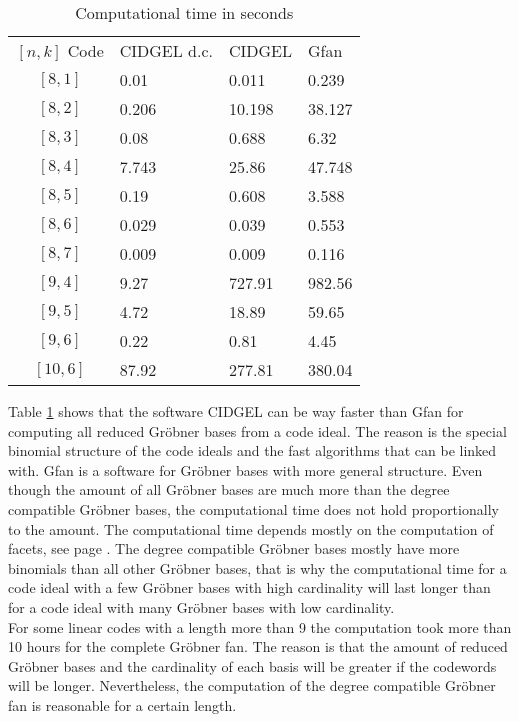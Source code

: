  \begin{table}[htpb] 
 \centering 
 \caption{Computational time in seconds}
 \begin{tabular}{c|l|l|l} %
   $[n,k]$ Code & CIDGEL d.c. & CIDGEL & Gfan \\
 \cline{1-4} $[8,1]$  & 0.01  & 0.011  & 0.239 \\
 			 $[8,2]$  & 0.206 & 10.198 & 38.127 \\
  			 $[8,3]$  & 0.08  & 0.688  & 6.32 \\
  			 $[8,4]$  & 7.743 & 25.86  & 47.748 \\
 			 $[8,5]$  & 0.19  & 0.608  & 3.588  \\
 			 $[8,6]$  & 0.029 & 0.039  & 0.553\\
  			 $[8,7]$  & 0.009 & 0.009  & 0.116 \\
  			 $[9,4]$  & 9.27  & 727.91 & 982.56 \\
  			 $[9,5]$  & 4.72  & 18.89  & 59.65 \\
  			 $[9,6]$  & 0.22  & 0.81   & 4.45 \\
  			 $[10,6]$ & 87.92 & 277.81 & 380.04 \\
 \end{tabular}
 \label{tab:benchmark}
 \end{table}  
 
 \newpage
 
 Table \ref{tab:benchmark} shows that the software CIDGEL can be way faster than Gfan for computing all reduced Gröbner bases from a code ideal. The reason is the special binomial structure of the code ideals and the fast algorithms that can be linked with. Gfan is a software for Gröbner bases with more general structure.
 Even though the amount of all Gröbner bases are much more than the degree compatible Gröbner bases, the computational time does not hold proportionally to the amount.
 The computational time depends mostly on the computation of facets, see page \pageref{facets}. The degree compatible Gröbner bases mostly have more binomials than all other Gröbner bases, that is why the computational time for a code ideal with a few Gröbner bases with high cardinality will last longer than for a code ideal with many Gröbner bases with low cardinality. \\
 
 For some linear codes with a length more than 9 the computation took more than 10 hours for the complete Gröbner fan. The reason is that the amount of reduced Gröbner bases and the cardinality of each basis will be greater if the codewords will be longer. Nevertheless, the computation of the degree compatible Gröbner fan is reasonable for a certain length.\newpage
 
